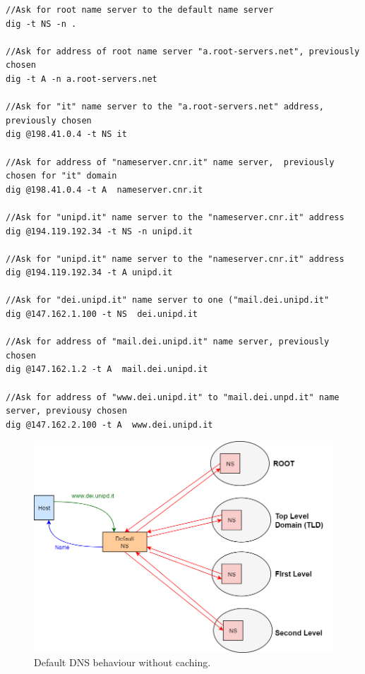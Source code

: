 \begin{lstlisting}[linewidth=470pt, style=code, caption=Example of default DNS queries using dig.]
//Ask for root name server to the default name server 
dig -t NS -n .
 
//Ask for address of root name server "a.root-servers.net", previously chosen
dig -t A -n a.root-servers.net 

//Ask for "it" name server to the "a.root-servers.net" address, previously chosen
dig @198.41.0.4 -t NS it 

//Ask for address of "nameserver.cnr.it" name server,  previously chosen for "it" domain
dig @198.41.0.4 -t A  nameserver.cnr.it

//Ask for "unipd.it" name server to the "nameserver.cnr.it" address 
dig @194.119.192.34 -t NS -n unipd.it

//Ask for "unipd.it" name server to the "nameserver.cnr.it" address 
dig @194.119.192.34 -t A unipd.it

//Ask for "dei.unipd.it" name server to one ("mail.dei.unipd.it" 
dig @147.162.1.100 -t NS  dei.unipd.it

//Ask for address of "mail.dei.unipd.it" name server, previously chosen 
dig @147.162.1.2 -t A  mail.dei.unipd.it 

//Ask for address of "www.dei.unipd.it" to "mail.dei.unpd.it" name server, previousy chosen 
dig @147.162.2.100 -t A  www.dei.unipd.it
\end{lstlisting} 
\begin{figure}[h]
\centering
\includegraphics[scale=0.4]{Images/Resolution/default_DNS}
\caption{\footnotesize{Default DNS behaviour without caching.}}\label{default_DNS}
\end{figure}
